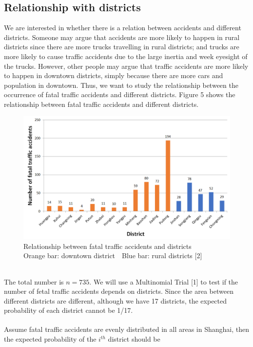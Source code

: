 \documentclass[a4paper,12pt]{article}
\begin{document}
\subsection{Relationship with districts}
\noindent  We are interested in whether there is a relation between accidents and different districts. Someone may argue that accidents are more likely to happen in rural districts since there are more trucks travelling in rural districts; and trucks are more likely to cause traffic accidents due to the large inertia and week eyesight of the trucks. However, other people may argue that traffic accidents are more likely to happen in downtown districts, simply because there are more cars and population in downtown. Thus, we want to study the relationship between the occurrence of fatal traffic accidents and different districts.
Figure 5 shows the relationship between fatal traffic accidents and different districts.\\
\begin{figure}[hbp]
\centering
\includegraphics[scale=0.75]{district.PNG}
\caption{Relationship between fatal traffic accidents and  districts\\Orange bar: downtown district$\quad$Blue bar: rural districts [2]}
\end{figure}
\noindent \\The total number is $n=735$. We will use a Multinomial Trial [1] to test if the number of fetal traffic accidents depends on districts. Since the area between different districts are different, although we have 17 districts, the expected probability of each district cannot be 1/17.\\\\
Assume fatal traffic accidents are evenly distributed in all areas in Shanghai, then the expected probability of the $i^{th}$ district should be
\end{document}
